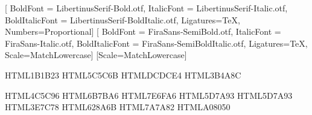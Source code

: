 
\usepackage{polyglossia}
\setdefaultlanguage{russian}

\usepackage{unicode-math}
\setmainfont{LibertinusSerif-Regular.otf}[
  BoldFont       = LibertinusSerif-Bold.otf,
  ItalicFont     = LibertinusSerif-Italic.otf,
  BoldItalicFont = LibertinusSerif-BoldItalic.otf,
  Ligatures=TeX, Numbers=Proportional]
\setsansfont{FiraSans-Regular.otf}[
  BoldFont       = FiraSans-SemiBold.otf,
  ItalicFont     = FiraSans-Italic.otf,
  BoldItalicFont = FiraSans-SemiBoldItalic.otf,
  Ligatures=TeX, Scale=MatchLowercase]
\setmonofont{FiraMono-Regular.otf}[Scale=MatchLowercase]

\usepackage{microtype}

\usepackage[
  a4paper,
  top=24mm, bottom=22mm, left=26mm, right=32mm,
  marginparwidth=20mm, marginparsep=6mm,
  headsep=7mm, footskip=12mm
]{geometry}

\usepackage[skip=6pt plus 2pt, indent=0pt]{parskip}
\linespread{1.04}

\usepackage[dvipsnames]{xcolor}

\definecolor{ink}      {HTML}{1B1B23}   %
\definecolor{inkSoft}  {HTML}{5C5C6B}   %
\definecolor{ruleC}    {HTML}{DCDCE4}   %
\definecolor{accent}   {HTML}{3B4A8C}   %

\definecolor{cThm}     {HTML}{4C5C96}   %
\definecolor{cLem}     {HTML}{6B7BA6}   %
\definecolor{cCor}     {HTML}{7E6FA6}   %
\definecolor{cProp}    {HTML}{5D7A93}   %
\definecolor{cStmt}    {HTML}{5D7A93}   %
\definecolor{cDef}     {HTML}{3E7C78}   %
\definecolor{cEx}      {HTML}{628A6B}   %
\definecolor{cRem}     {HTML}{7A7A82}   %
\definecolor{cAdd}     {HTML}{A08050}   %

